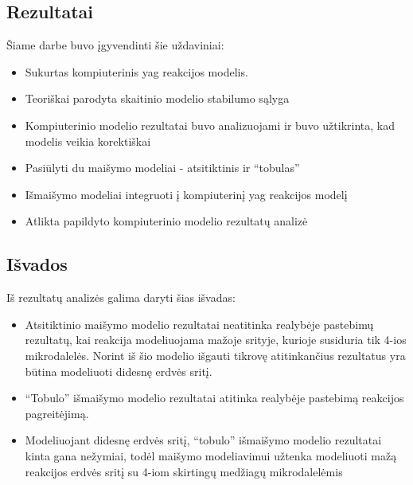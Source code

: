 
\subsection*{Rezultatai}

Šiame darbe buvo įgyvendinti šie uždaviniai:

\begin{itemize}
    \item Sukurtas kompiuterinis \acs{yag} reakcijos modelis. 
    \item Teoriškai parodyta skaitinio modelio stabilumo sąlyga
    \item Kompiuterinio modelio rezultatai buvo analizuojami ir buvo užtikrinta, kad modelis veikia korektiškai
    \item Pasiūlyti du maišymo modeliai - atsitiktinis ir \enquote{tobulas}
    \item Išmaišymo modeliai integruoti į kompiuterinį \acs{yag} reakcijos modelį
    \item Atlikta papildyto kompiuterinio modelio rezultatų analizė
\end{itemize}

\subsection*{Išvados}

Iš rezultatų analizės galima daryti šias išvadas:

\begin{itemize}
    \item Atsitiktinio maišymo modelio rezultatai neatitinka realybėje pastebimų rezultatų, kai reakcija modeliuojama mažoje srityje, kurioje susiduria tik 4-ios mikrodalelės. Norint iš šio modelio išgauti tikrovę atitinkančius rezultatus yra būtina modeliuoti didesnę erdvės sritį.

    \item \enquote{Tobulo} išmaišymo modelio rezultatai atitinka realybėje pastebimą reakcijos pagreitėjimą.
    
    \item Modeliuojant didesnę erdvės sritį, \enquote{tobulo} išmaišymo modelio rezultatai kinta gana nežymiai, todėl maišymo modeliavimui užtenka modeliuoti mažą reakcijos erdvės sritį su 4-iom skirtingų medžiagų mikrodalelėmis

\end{itemize}